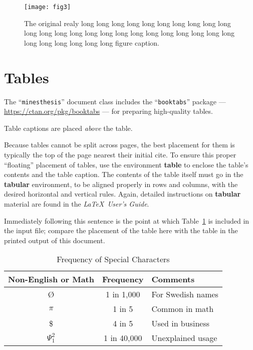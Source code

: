 \begin{figure}[h]
	\centering
	\texttt{[image: fig3]}
	\caption[Short version caption for LoF, the original caption is really long]{The original realy long long long long long long long long long long long long long long long long long long long long long long long long long long long long long long figure caption.}
\end{figure}
\section{Tables}

The ``\verb|minesthesis|'' document class includes the ``\verb|booktabs|''
package --- \url{https://ctan.org/pkg/booktabs} --- for preparing
high-quality tables.

Table captions are placed {\itshape above} the table.

Because tables cannot be split across pages, the best placement for
them is typically the top of the page nearest their initial cite. To
ensure this proper ``floating'' placement of tables, use the
environment \textbf{table} to enclose the table's contents and the
table caption. The contents of the table itself must go in the
\textbf{tabular} environment, to be aligned properly in rows and
columns, with the desired horizontal and vertical rules. Again,
detailed instructions on \textbf{tabular} material are found in the
\textit{\LaTeX\ User's Guide}.

Immediately following this sentence is the point at which
Table~\ref{tab:freq} is included in the input file; compare the
placement of the table here with the table in the printed output of
this document.

\begin{table}[h]
	\caption{Frequency of Special Characters}
	\label{tab:freq}
	\centering
	\begin{tabular}{ccl}
		\toprule
		Non-English or Math & Frequency   & Comments          \\
		\midrule
		\O                  & 1 in 1,000  & For Swedish names \\
		$\pi$               & 1 in 5      & Common in math    \\
		\$                  & 4 in 5      & Used in business  \\
		$\Psi^2_1$          & 1 in 40,000 & Unexplained usage \\
		\bottomrule
	\end{tabular}
\end{table}


